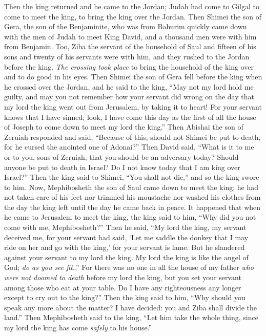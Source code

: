 \begin{biblechapter}
\verse Then the king returned and he came to the Jordan; Judah had come to Gilgal to come to meet the king, to bring the king over the Jordan.
\verse Then Shimei the son of Gera, the son of the Benjaminite, who was from Bahurim quickly came down with the men of Judah to meet King David,
\verse and a thousand men were with him from Benjamin. Too, Ziba the servant of the household of Saul and fifteen of his sons and twenty of his servants were with him, and they rushed to the Jordan before the king.
\verse \textit{The crossing took place} to bring the household of the king over and to do good in his eyes. Then Shimei the son of Gera fell before the king when he crossed over the Jordan,
\verse and he said to the king, “May not my lord hold me guilty, and may you not remember how your servant did wrong on the day that my lord the king went out from Jerusalem, by taking it to heart!
\verse For your servant knows that I have sinned; look, I have come this day as the first of all the house of Joseph to come down to meet my lord the king.”
\verse Then Abishai the son of Zeruiah responded and said, “Because of this, should not Shimei be put to death, for he cursed the anointed one of Adonai?”
\verse Then David said, “What is it to me or to you, sons of Zeruiah, that you should be an adversary today? Should anyone be put to death in Israel? Do I not know today that I am king over Israel?”
\verse Then the king said to Shimei, “You shall not die,” and so the king swore to him.
\verse Now, Mephibosheth the son of Saul came down to meet the king; he had not taken care of his feet nor trimmed his moustache nor washed his clothes from the day the king left until the day he came back in peace.
\verse It happened that when he came to Jerusalem to meet the king, the king said to him, “Why did you not come with me, Mephibosheth?”
\verse Then he said, “My lord the king, my servant deceived me, for your servant had said, ‘Let me saddle the donkey that I may ride on her and go with the king,’ for your servant is lame.
\verse But he slandered against your servant to my lord the king. My lord the king is like the angel of God; \textit{do as you see fit.}.”
\verse For there was no one in all the house of my father \textit{who were not doomed to death} before my lord the king, but you set your servant among those who eat at your table. Do I have any righteousness any longer except to cry out to the king?”
\verse Then the king said to him, “Why should you speak any more about the matter? I have decided: you and Ziba shall divide the land.”
\verse Then Mephibosheth said to the king, “Let him take the whole thing, since my lord the king has come \textit{safely} to his house.”

\end{biblechapter}
